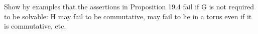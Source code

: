 Show by examples that the assertions in Proposition 19.4 fail if G is not required to be solvable: H may fail to be commutative, may fail to lie in a torus even if it is commutative, etc.
